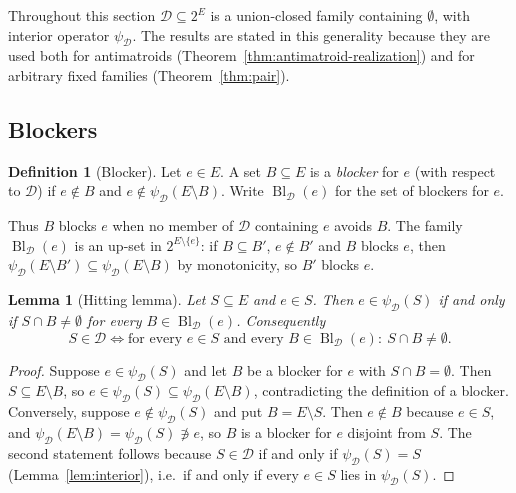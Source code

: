 \documentclass[11pt,a4paper]{article}
\theoremstyle{plain}
\newtheorem{lemma}[theorem]{Lemma}
\theoremstyle{definition}
\newtheorem{definition}[theorem]{Definition}
\theoremstyle{remark}
\newcommand{\Bl}{\operatorname{Bl}}
\newcommand{\cD}{\mathcal{D}}
\newcommand{\pw}[1]{2^{#1}}
\begin{document}
Throughout this section $\cD\subseteq\pw{E}$ is a union-closed family containing $\emptyset$, with interior operator $\psi_{\cD}$. The results are stated in this generality because they are used both for antimatroids (Theorem~\ref{thm:antimatroid-realization}) and for arbitrary fixed families (Theorem~\ref{thm:pair}).

\subsection{Blockers}

\begin{definition}[Blocker]\label{def:blocker}
Let $e\in E$. A set $B\subseteq E$ is a \emph{blocker} for $e$ (with respect to $\cD$) if $e\notin B$ and $e\notin\psi_{\cD}(E\setminus B)$. Write $\Bl_{\cD}(e)$ for the set of blockers for $e$.
\end{definition}

Thus $B$ blocks $e$ when no member of $\cD$ containing $e$ avoids $B$. The family $\Bl_{\cD}(e)$ is an up-set in $\pw{E\setminus\{e\}}$: if $B\subseteq B'$, $e\notin B'$ and $B$ blocks $e$, then $\psi_{\cD}(E\setminus B')\subseteq\psi_{\cD}(E\setminus B)$ by monotonicity, so $B'$ blocks $e$.

\begin{lemma}[Hitting lemma]\label{lem:hitting}
Let $S\subseteq E$ and $e\in S$. Then $e\in\psi_{\cD}(S)$ if and only if $S\cap B\neq\emptyset$ for every $B\in\Bl_{\cD}(e)$. Consequently
\[
S\in\cD\iff\text{for every }e\in S\text{ and every }B\in\Bl_{\cD}(e):\ S\cap B\neq\emptyset.
\]
\end{lemma}

\begin{proof}
Suppose $e\in\psi_{\cD}(S)$ and let $B$ be a blocker for $e$ with $S\cap B=\emptyset$. Then $S\subseteq E\setminus B$, so $e\in\psi_{\cD}(S)\subseteq\psi_{\cD}(E\setminus B)$, contradicting the definition of a blocker. Conversely, suppose $e\notin\psi_{\cD}(S)$ and put $B=E\setminus S$. Then $e\notin B$ because $e\in S$, and $\psi_{\cD}(E\setminus B)=\psi_{\cD}(S)\not\ni e$, so $B$ is a blocker for $e$ disjoint from $S$. The second statement follows because $S\in\cD$ if and only if $\psi_{\cD}(S)=S$ (Lemma~\ref{lem:interior}), i.e.\ if and only if every $e\in S$ lies in $\psi_{\cD}(S)$.
\end{proof}
\end{document}
